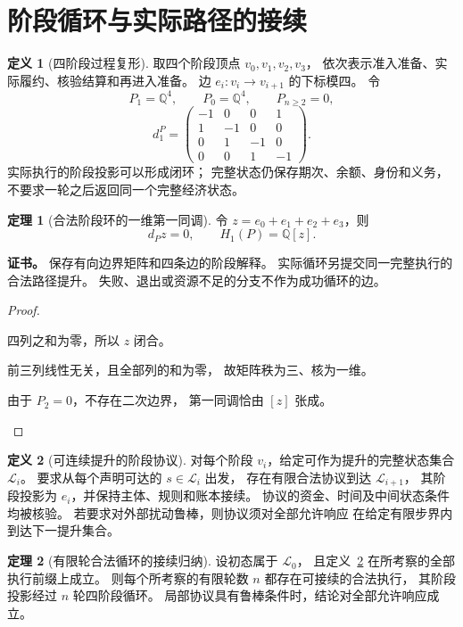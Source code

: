 \documentclass[UTF8,12pt,a4paper,openany,fontset=none,zihao=false]{ctexrep}
\theoremstyle{definition}
\newtheorem{definition}{定义}[chapter]
\newtheorem{theorem}{定理}[chapter]
\newenvironment{certificate}{\par\noindent\textbf{证书。}\ignorespaces}{\par}
\newcommand{\1}{\mathbf 1}
\begin{document}
\section{阶段循环与实际路径的接续}
\begin{definition}[四阶段过程复形]
\label{cyc:phase}
取四个阶段顶点 \(v_0,v_1,v_2,v_3\)，
依次表示准入准备、实际履约、核验结算和再进入准备。
边 \(e_i:v_i\to v_{i+1}\) 的下标模四。
令
\[
P_1=\mathbb Q^4,\qquad P_0=\mathbb Q^4,\qquad P_{n\ge2}=0,
\]
\[
d_1^P=
\begin{pmatrix}
-1&0&0&1\\
1&-1&0&0\\
0&1&-1&0\\
0&0&1&-1
\end{pmatrix}.
\]
实际执行的阶段投影可以形成闭环；
完整状态仍保存期次、余额、身份和义务，
不要求一轮之后返回同一个完整经济状态。
\end{definition}
\begin{theorem}[合法阶段环的一维第一同调]
\label{cyc:homology}
令 \(z=e_0+e_1+e_2+e_3\)，则
\[
d_Pz=0,\qquad H_1(P)=\mathbb Q[z].
\]
\end{theorem}
\begin{certificate}
保存有向边界矩阵和四条边的阶段解释。
实际循环另提交同一完整执行的合法路径提升。
失败、退出或资源不足的分支不作为成功循环的边。
\end{certificate}
\begin{proof}
\begin{semanticsteps}
\item 四列之和为零，所以 \(z\) 闭合。
\item 前三列线性无关，且全部列的和为零，
故矩阵秩为三、核为一维。
\item 由于 \(P_2=0\)，不存在二次边界，
第一同调恰由 \([z]\) 张成。
\end{semanticsteps}
\end{proof}
\begin{definition}[可连续提升的阶段协议]
\label{cyc:lifting}
对每个阶段 \(v_i\)，给定可作为提升的完整状态集合 \(\mathcal L_i\)。
要求从每个声明可达的 \(s\in\mathcal L_i\) 出发，
存在有限合法协议到达 \(\mathcal L_{i+1}\)，
其阶段投影为 \(e_i\)，并保持主体、规则和账本接续。
协议的资金、时间及中间状态条件均被核验。
若要求对外部扰动鲁棒，则协议须对全部允许响应
在给定有限步界内到达下一提升集合。
\end{definition}
\begin{theorem}[有限轮合法循环的接续归纳]
\label{cyc:finite-lifting}
设初态属于 \(\mathcal L_0\)，
且定义~\ref{cyc:lifting} 在所考察的全部执行前缀上成立。
则每个所考察的有限轮数 \(n\) 都存在可接续的合法执行，
其阶段投影经过 \(n\) 轮四阶段循环。
局部协议具有鲁棒条件时，结论对全部允许响应成立。
\end{theorem}
\end{document}
